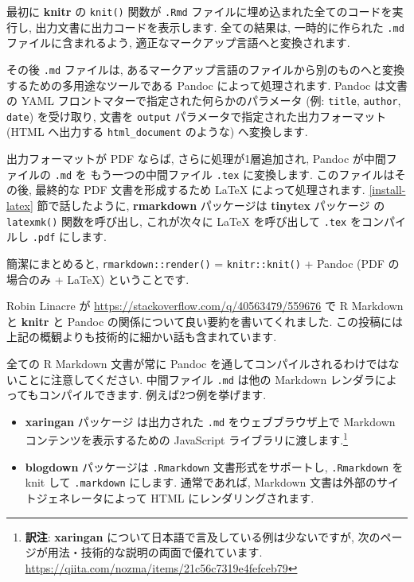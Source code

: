 \documentclass[
  11pt,
  lualatex,
  ja=standard]{bxjsreport}
\begin{document}
最初に \textbf{knitr} \autocite{R-knitr} の \texttt{knit()} 関数が \texttt{.Rmd} ファイルに埋め込まれた全てのコードを実行し, 出力文書に出力コードを表示します. 全ての結果は, 一時的に作られた \texttt{.md} ファイルに含まれるよう, 適正なマークアップ言語へと変換されます.

その後 \texttt{.md} ファイルは, あるマークアップ言語のファイルから別のものへと変換するための多用途なツールである Pandoc によって処理されます. Pandoc は文書の YAML フロントマターで指定された何らかのパラメータ (例: \texttt{title}, \texttt{author}, \texttt{date}) を受け取り, 文書を \texttt{output} パラメータで指定された出力フォーマット (HTML へ出力する \texttt{html\_document} のような) へ変換します.

出力フォーマットが PDF ならば, さらに処理が1層追加され, Pandoc が中間ファイルの \texttt{.md} を もう一つの中間ファイル \texttt{.tex} に変換します. このファイルはその後, 最終的な PDF 文書を形成するため LaTeX によって処理されます. \ref{install-latex} 節で話したように, \textbf{rmarkdown} パッケージは \textbf{tinytex} パッケージ \autocite{R-tinytex} の \texttt{latexmk()} 関数を呼び出し, これが次々に LaTeX を呼び出して \texttt{.tex} をコンパイルし \texttt{.pdf} にします.

簡潔にまとめると, \texttt{rmarkdown::render()} = \texttt{knitr::knit()} + Pandoc (PDF の場合のみ + LaTeX) ということです.

Robin Linacre が \url{https://stackoverflow.com/q/40563479/559676} で R Markdown と \textbf{knitr} と Pandoc の関係について良い要約を書いてくれました. この投稿には上記の概観よりも技術的に細かい話も含まれています.

全ての R Markdown 文書が常に Pandoc を通してコンパイルされるわけではないことに注意してください. 中間ファイル \texttt{.md} は他の Markdown レンダラによってもコンパイルできます. 例えば2つ例を挙げます.

\begin{itemize}
\item
  \textbf{xaringan} パッケージ \autocite{R-xaringan} は出力された \texttt{.md} をウェブブラウザ上で Markdown コンテンツを表示するための JavaScript ライブラリに渡します.\footnote{\textbf{訳注}: \textbf{xaringan} について日本語で言及している例は少ないですが, 次のページが用法・技術的な説明の両面で優れています. \url{https://qiita.com/nozma/items/21c56c7319e4fefceb79}}
\item
  \textbf{blogdown} パッケージは \autocite{R-blogdown} \texttt{.Rmarkdown} 文書形式をサポートし, \texttt{.Rmarkdown} を knit して \texttt{.markdown} にします. 通常であれば, Markdown 文書は外部のサイトジェネレータによって HTML にレンダリングされます.
\end{itemize}
\end{document}
